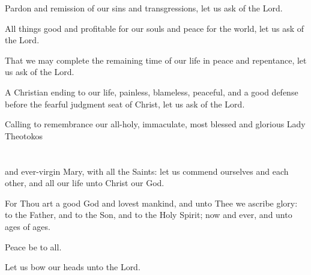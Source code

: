 \documentclass[twoside, letterpaper, 12pt]{report}
\begin{document}
\begin{deacon}
\item Pardon and remission of our sins and transgressions, let us ask of the Lord.
\item All things good and profitable for our souls and peace for the world, let us ask of the Lord.
\item That we may complete the remaining time of our life in peace and repentance, let
    us ask of the Lord.
\item A Christian ending to our life, painless, blameless, peaceful, and a good defense
    before the fearful judgment seat of Christ, let us ask of the Lord.
\item Calling to remembrance our all-holy, immaculate, most blessed and glorious Lady Theotokos\\
    \\
    \\
    and ever-virgin Mary, with all the Saints: let us commend ourselves and each other,
    and all our life unto Christ our God.
\end{deacon}

\begin{priest}
\item For Thou art a good God and lovest mankind, and unto Thee we ascribe glory:
    to the Father, and to the Son, and to the Holy Spirit; now and ever, and unto ages of ages.
\end{priest}



\begin{priest}
\item Peace be to all.
\end{priest}

\begin{deacon}
\item Let us bow our heads unto the Lord.
\end{deacon}

\end{document}
